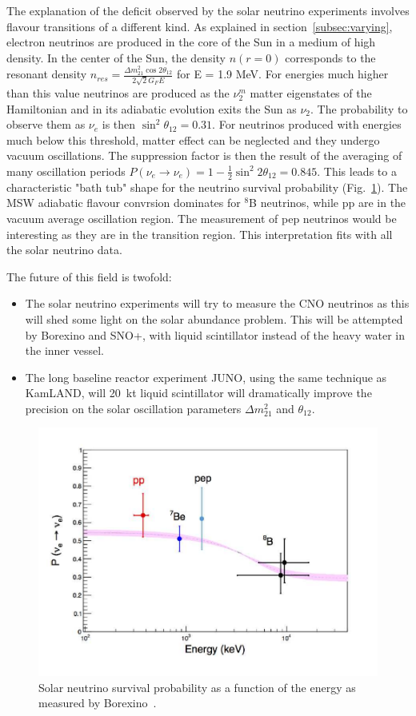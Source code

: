 The explanation of the deficit observed by the solar neutrino experiments involves flavour transitions of a different kind. As explained in section~\ref{subsec:varying}, electron neutrinos are produced in the core of the Sun in a medium of high density. 
In the center of the Sun, the density $n(r=0)$ corresponds to the resonant density $ n_{res}= \frac{\Delta m^2_{21} \cos 2 \theta_{12}}{ 2 \sqrt{2}G_F E}$ for E = 1.9 MeV. For energies much higher than this value
neutrinos are produced as the $ \nu^m_2$ matter eigenstates of the Hamiltonian and in its adiabatic evolution exits the Sun as $\nu_2$. The probability to observe them as $\nu_e$ is then $\sin^2 \theta_{12}= 0.31$. For neutrinos produced with energies much below this threshold, matter effect can be neglected and they undergo vacuum oscillations. The suppression factor is then the result of the averaging of many oscillation periods    
$ P({\nu}_e \rightarrow {\nu}_e ) = 1 - \frac{1}{2} \sin^2 2 \theta_{12}=0.845$. 
This leads to a characteristic "bath tub" shape for the neutrino survival probability (Fig.~\ref{fig:sol-bor}). The MSW adiabatic flavour convrsion dominates for $^8$B neutrinos, while pp are in the vacuum average oscillation region. The measurement of pep neutrinos would be interesting as they are in the transition region.
This interpretation fits with all the solar neutrino data. 

The future of this field is twofold:
\begin{itemize}
\item The solar neutrino experiments will try to measure the CNO neutrinos as this will shed some light on the solar abundance problem. This will be attempted by Borexino and SNO+, with liquid scintillator instead of the heavy water in the inner vessel.
\item The long baseline reactor experiment JUNO, using the same technique as KamLAND, will 20~kt liquid scintillator will dramatically improve the precision on the solar oscillation parameters  $\Delta m^2_{21}$ and $\theta_{12}$.
\end{itemize}


\begin{figure}[htbp]
\centering
\includegraphics[width=0.6\linewidth]{figures/derbin_fig5c.pdf}
  \caption{
  Solar neutrino survival probability as a function of the energy as measured by Borexino~\cite{derbin2016}.
}
 \label{fig:sol-bor}
 \end{figure}
